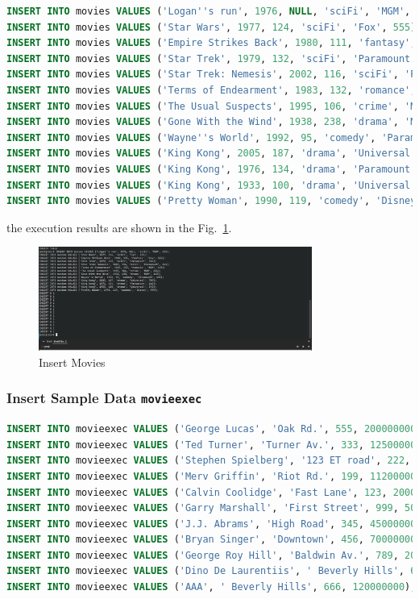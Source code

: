 \documentclass{cshwk}
\begin{document}
\begin{lstlisting}[language=sql]
INSERT INTO movies VALUES ('Logan''s run', 1976, NULL, 'sciFi', 'MGM', 123);
INSERT INTO movies VALUES ('Star Wars', 1977, 124, 'sciFi', 'Fox', 555);
INSERT INTO movies VALUES ('Empire Strikes Back', 1980, 111, 'fantasy', 'Fox', 555);
INSERT INTO movies VALUES ('Star Trek', 1979, 132, 'sciFi', 'Paramount', 345);
INSERT INTO movies VALUES ('Star Trek: Nemesis', 2002, 116, 'sciFi', 'Paramount', 345);
INSERT INTO movies VALUES ('Terms of Endearment', 1983, 132, 'romance', 'MGM', 123);
INSERT INTO movies VALUES ('The Usual Suspects', 1995, 106, 'crime', 'MGM', 456);
INSERT INTO movies VALUES ('Gone With the Wind', 1938, 238, 'drama', 'MGM', 123);
INSERT INTO movies VALUES ('Wayne''s World', 1992, 95, 'comedy', 'Paramount', 123);
INSERT INTO movies VALUES ('King Kong', 2005, 187, 'drama', 'Universal', 789);
INSERT INTO movies VALUES ('King Kong', 1976, 134, 'drama', 'Paramount', 666);
INSERT INTO movies VALUES ('King Kong', 1933, 100, 'drama', 'Universal', 345);
INSERT INTO movies VALUES ('Pretty Woman', 1990, 119, 'comedy', 'Disney', 999);
\end{lstlisting}

the execution results are shown in the Fig.~\ref{fig:insert-movies}.
\begin{figure}[H]
    \centering
    \includegraphics[width=0.8\textwidth]{hw5-2.png}
    \caption{Insert Movies}
    \label{fig:insert-movies}
\end{figure}

\subsubsection{Insert Sample Data \texttt{movieexec}}

\begin{lstlisting}[language=sql]
INSERT INTO movieexec VALUES ('George Lucas', 'Oak Rd.', 555, 200000000);
INSERT INTO movieexec VALUES ('Ted Turner', 'Turner Av.', 333, 125000000);
INSERT INTO movieexec VALUES ('Stephen Spielberg', '123 ET road', 222, 100000000);
INSERT INTO movieexec VALUES ('Merv Griffin', 'Riot Rd.', 199, 112000000);
INSERT INTO movieexec VALUES ('Calvin Coolidge', 'Fast Lane', 123, 20000000);
INSERT INTO movieexec VALUES ('Garry Marshall', 'First Street', 999, 50000000);
INSERT INTO movieexec VALUES ('J.J. Abrams', 'High Road', 345, 45000000);
INSERT INTO movieexec VALUES ('Bryan Singer', 'Downtown', 456, 70000000);
INSERT INTO movieexec VALUES ('George Roy Hill', 'Baldwin Av.', 789, 20000000);
INSERT INTO movieexec VALUES ('Dino De Laurentiis', ' Beverly Hills', 666, 120000000);
INSERT INTO movieexec VALUES ('AAA', ' Beverly Hills', 666, 120000000);
\end{lstlisting}
\end{document}
